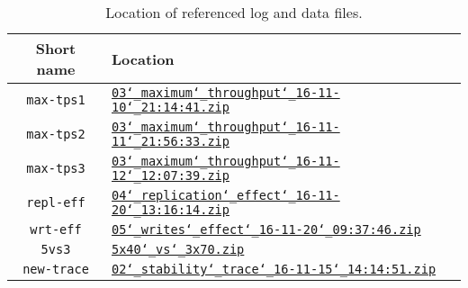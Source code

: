 \documentclass[11pt]{article}
\theoremstyle{definition}
\renewcommand\t\texttt
\newcommand\tpsfstd{03\char`_maximum\char`_throughput\char`_16-11-10\char`_21:14:41}
\newcommand\tpsfst{03_maximum_throughput_16-11-10_21:14:41}
\newcommand\tpssndd{03\char`_maximum\char`_throughput\char`_16-11-11\char`_21:56:33}
\newcommand\tpssnd{03_maximum_throughput_16-11-11_21:56:33}
\newcommand\tpstrdd{03\char`_maximum\char`_throughput\char`_16-11-12\char`_12:07:39}
\newcommand\tpstrd{03_maximum_throughput_16-11-12_12:07:39}
\newcommand\repld{04\char`_replication\char`_effect\char`_16-11-20\char`_13:16:14}
\newcommand\repl{04_replication_effect_16-11-20_13:16:14}
\newcommand\wrtd{05\char`_writes\char`_effect\char`_16-11-20\char`_09:37:46}
\newcommand\wrt{05_writes_effect_16-11-21_09:37:46}
\newcommand\fvstd{5x40\char`_vs\char`_3x70}
\newcommand\fvst{5x40_vs_3x70}
\newcommand\newtraced{02\char`_stability\char`_trace\char`_16-11-15\char`_14:14:51}
\newcommand\newtrace{02_stability_trace_16-11-15_14:14:51}
\begin{document}
\begin{appendices}
\begin{table}[h]
    \centering
    \small
    {
        \smallskip
        \begin{tabular}{|c|l|}
            \hline
            \textbf{Short name} & \textbf{Location} \\
            \hline\hline
            \t{max-tps1}\label{f:tps1} & \href{https://gitlab.inf.ethz.ch/fbanfi/asl-fall16-project/blob/master/log/experiments/\tpsfst.zip}{\t{\tpsfstd.zip}} \\
            \t{max-tps2}\label{f:tps2} & \href{https://gitlab.inf.ethz.ch/fbanfi/asl-fall16-project/blob/master/log/experiments/\tpssnd.zip}{\t{\tpssndd.zip}} \\
            \t{max-tps3}\label{f:tps3} & \href{https://gitlab.inf.ethz.ch/fbanfi/asl-fall16-project/blob/master/log/experiments/\tpstrd.zip}{\t{\tpstrdd.zip}} \\
            \hline
            \t{repl-eff}\label{f:repl} & \href{https://gitlab.inf.ethz.ch/fbanfi/asl-fall16-project/blob/master/log/experiments/\repl.zip}{\t{\repld.zip}} \\
            \hline
            \t{wrt-eff}\label{f:wrt} & \href{https://gitlab.inf.ethz.ch/fbanfi/asl-fall16-project/blob/master/log/experiments/\wrt.zip}{\t{\wrtd.zip}} \\
            \hline
            \hline
            \t{5vs3}\label{f:5vs3} & \href{https://gitlab.inf.ethz.ch/fbanfi/asl-fall16-project/blob/master/log/experiments/\fvst.zip}{\t{\fvstd.zip}} \\
            \hline
            \t{new-trace}\label{f:new-trace} & \href{https://gitlab.inf.ethz.ch/fbanfi/asl-fall16-project/blob/master/log/experiments/\newtrace.zip}{\t{\newtraced.zip}} \\
            \hline
        \end{tabular} 
    }
    \caption{Location of referenced log and data files.}
    \label{tab:logs}
\end{table}
\end{appendices}
 
\end{document}
